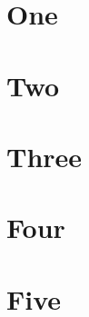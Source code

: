 \documentclass{article}
\begin{document}
	\tableofcontents
	\newpage
	\section{One}
	\blindtext[1]
	\newpage
	\section{Two}
	\blindtext[1]
	\newpage
	\section{Three}
	\blindtext[1]
	\newpage
	\section{Four}
	\blindtext[1]
	\newpage
	\section{Five}
	\blindtext[1]
\end{document}
